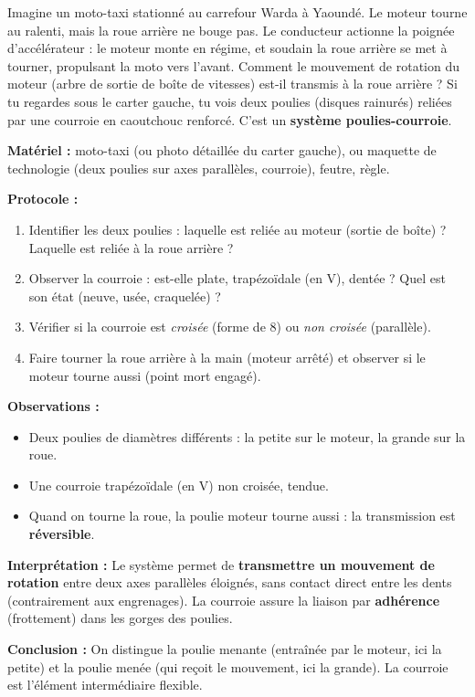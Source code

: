 \documentclass[11pt]{article}
\newcommand{\cle}[1]{{\popxbold\color{popdark}#1}}
\begin{document}
Imagine un moto-taxi stationné au carrefour \og Warda \fg{} à Yaoundé. Le moteur tourne au ralenti, mais la roue arrière ne bouge pas. Le conducteur actionne la poignée d'accélérateur : le moteur monte en régime, et soudain la roue arrière se met à tourner, propulsant la moto vers l'avant. Comment le mouvement de rotation du moteur (arbre de sortie de boîte de vitesses) est-il transmis à la roue arrière ? Si tu regardes sous le carter gauche, tu vois deux \cle{poulies} (disques rainurés) reliées par une \cle{courroie} en caoutchouc renforcé. C'est un \textbf{système poulies-courroie}.

\begin{experience}
\textbf{Matériel :} moto-taxi (ou photo détaillée du carter gauche), ou maquette de technologie (deux poulies sur axes parallèles, courroie), feutre, règle.

\textbf{Protocole :}
\begin{enumerate}
\item Identifier les deux poulies : laquelle est reliée au moteur (sortie de boîte) ? Laquelle est reliée à la roue arrière ?
\item Observer la courroie : est-elle plate, trapézoïdale (en V), dentée ? Quel est son état (neuve, usée, craquelée) ?
\item Vérifier si la courroie est \emph{croisée} (forme de 8) ou \emph{non croisée} (parallèle).
\item Faire tourner la roue arrière à la main (moteur arrêté) et observer si le moteur tourne aussi (point mort engagé).
\end{enumerate}

\textbf{Observations :}
\begin{itemize}
\item Deux poulies de diamètres différents : la petite sur le moteur, la grande sur la roue.
\item Une courroie trapézoïdale (en V) non croisée, tendue.
\item Quand on tourne la roue, la poulie moteur tourne aussi : la transmission est \textbf{réversible}.
\end{itemize}

\textbf{Interprétation :} Le système permet de \textbf{transmettre un mouvement de rotation} entre deux axes parallèles éloignés, sans contact direct entre les dents (contrairement aux engrenages). La courroie assure la liaison par \textbf{adhérence} (frottement) dans les gorges des poulies.

\textbf{Conclusion :} On distingue la \cle{poulie menante} (entraînée par le moteur, ici la petite) et la \cle{poulie menée} (qui reçoit le mouvement, ici la grande). La courroie est l'élément intermédiaire flexible.
\end{experience}
\end{document}
